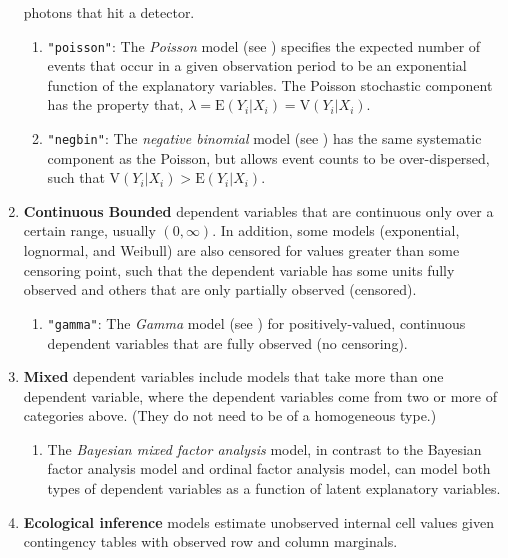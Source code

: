 \begin{enumerate}
photons that hit a detector. 
    \begin{enumerate}
    \item {\tt "poisson"}: The {\it Poisson} model (see
      ) specifies the expected number of events that
      occur in a given observation period to be an exponential
      function of the explanatory variables.  The Poisson stochastic
      component has the property that, $\lambda = \textrm{E}(Y_i|X_i)
      = \textrm{V}(Y_i|X_i)$.
    \item {\tt "negbin"}: The {\it negative binomial} model (see
      ) has the same systematic component as the Poisson,
      but allows event counts to be over-dispersed, such that
      $\textrm{V}(Y_i|X_i) > \textrm{E}(Y_i|X_i)$.
    \end{enumerate}

  \item {\bf Continuous Bounded}\label{duration} dependent variables
that are continuous only over a certain range, usually $(0, \infty)$.
In addition, some models (exponential, lognormal, and
Weibull) are also censored for values greater than some censoring
point, such that the dependent variable has some units fully observed
and others that are only partially observed (censored).  

 \begin{enumerate}

   \item {\tt "gamma"}: The {\it Gamma} model (see ) for
     positively-valued, continuous dependent variables that are fully
observed (no censoring).  

\end{enumerate}

\item {\bf Mixed} dependent variables include models that take more
than one dependent variable, where the dependent variables come from
two or more of categories above.  (They do not need
to be of a homogeneous type.)
\begin{enumerate}
\item The {\it Bayesian mixed factor analysis} model, in contrast to the Bayesian factor
analysis model and ordinal factor analysis model, can model both types
of dependent variables as a function of latent explanatory variables.
\end{enumerate}

\item {\bf Ecological inference} models estimate unobserved internal
cell values given contingency tables with observed row and column
marginals.  


\end{enumerate}
